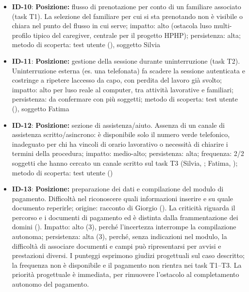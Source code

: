 \begin{itemize}
  condividerla con altri familiari coinvolti (serve uno screenshot
  manuale); impatto: medio-alto (soprattutto per il Segmento B);
  persistenza: alta; frequenza: 2/2 soggetti del Segmento B che hanno
  affrontato il tema (Silvia, ; Fatima, );
  metodo di scoperta: test utente ( e )
\item
  \hypertarget{req:ID-10}{}\textbf{ID-10}: \textbf{Posizione:} flusso di prenotazione per conto di
  un familiare associato (task T1). La selezione del familiare per cui
  si sta prenotando non è visibile o chiara nel punto del flusso in
  cui serve; impatto: alto (ostacola l\textquotesingle uso
  multi-profilo tipico del caregiver, centrale per il progetto HPHP);
  persistenza: alta; metodo di scoperta: test utente (), soggetto
  Silvia
\item
  \hypertarget{req:ID-11}{}\textbf{ID-11}: \textbf{Posizione:} gestione della sessione durante
  un\textquotesingle interruzione (task T2). Un\textquotesingle interruzione
  esterna (es. una telefonata) fa scadere la sessione autenticata e
  costringe a ripetere l\textquotesingle accesso da capo, con perdita
  del lavoro già svolto; impatto: alto per l\textquotesingle uso reale
  al computer, tra attività lavorative e familiari; persistenza:
  da confermare con più soggetti; metodo di scoperta: test utente
  (), soggetto Fatima
\item
  \hypertarget{req:ID-12}{}\textbf{ID-12}: \textbf{Posizione:} sezione di assistenza/aiuto.
  Assenza di un canale di assistenza scritto/asincrono: è disponibile
  solo il numero verde telefonico, inadeguato per chi ha vincoli di
  orario lavorativo o necessità di chiarire i termini della procedura;
  impatto: medio-alto; persistenza: alta; frequenza: 2/2 soggetti che
  hanno cercato un canale scritto sul task T3 (Silvia, ;
  Fatima, ); metodo di scoperta: test utente ()
\item
  \hypertarget{req:ID-13}{}\textbf{ID-13}: \textbf{Posizione:} preparazione dei dati e compilazione
  del modulo di pagamento. Difficoltà nel riconoscere quali informazioni
  inserire e su quale documento reperirle; origine: racconto di Giorgio
  (). La criticità riguarda il percorso e i documenti di
  pagamento ed è distinta dalla frammentazione dei domini ().
  Impatto: alto (3), perché l'incertezza interrompe la compilazione autonoma;
  persistenza: alta (3), perché, senza indicazioni nel modulo, la difficoltà
  di associare documenti e campi può ripresentarsi per avvisi e prestazioni diversi. I punteggi esprimono
  giudizi progettuali sul caso descritto; la frequenza non è disponibile
  e il pagamento non rientra nei task T1--T3. La priorità progettuale è
  immediata, per rimuovere l’ostacolo al completamento autonomo del pagamento.
\end{itemize}

